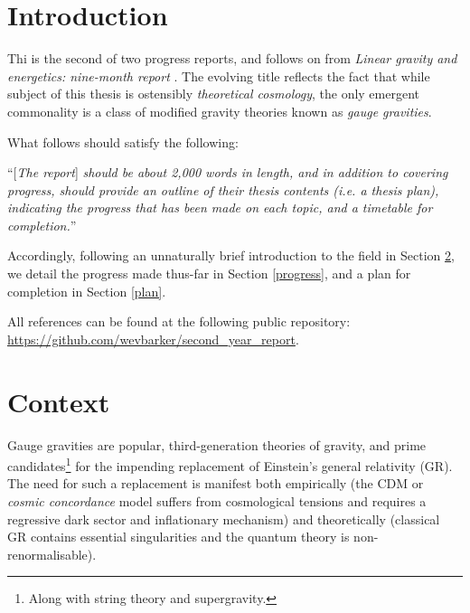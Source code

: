 \documentclass[twoside]{report}
\begin{document}
\date{\today}



\maketitle


\fi
\begin{multicols}{2}
\section{Introduction}
Thi is the second of two progress reports, and follows on from \textit{Linear gravity and energetics: nine-month report} \cite{lg}. The evolving title reflects the fact that while subject of this thesis is ostensibly \textit{theoretical cosmology}, the only emergent commonality is a class of modified gravity theories known as \textit{gauge gravities}.

What follows should satisfy the following:

``[\textit{The report}] \textit{should be about 2,000 words in length, and in addition to covering progress, should provide an outline of their thesis contents (i.e. a thesis plan), indicating the progress that has been made on each topic, and a timetable for completion.}''

Accordingly, following an unnaturally brief introduction to the field in Section \ref{context}, we detail the progress made thus-far in Section \ref{progress}, and a plan for completion in Section \ref{plan}.

All references can be found at the following public repository: \url{https://github.com/wevbarker/second_year_report}.
\section{Context}\label{context}
Gauge gravities are popular, third-generation theories of gravity, and prime candidates\footnote{Along with string theory and supergravity.} for the impending replacement of Einstein's general relativity (GR). The need for such a replacement is manifest both empirically (the \textLambda CDM or \textit{cosmic concordance} model suffers from cosmological tensions and requires a regressive dark sector and inflationary mechanism) and theoretically (classical GR contains essential singularities and the quantum theory is non-renormalisable).


\end{multicols}
\end{document}
